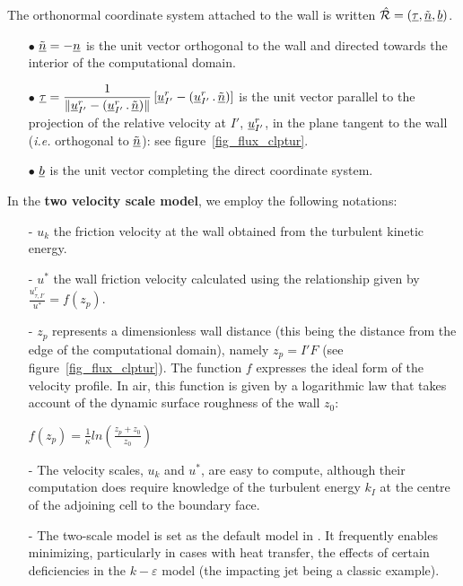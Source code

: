 The orthonormal coordinate system attached to the wall is written
$\hat {\mathcal R}=(\underline{\tau},\underline{\tilde{n}},\underline{b})$.
\begin{itemize}
\item [$\bullet$] $\underline{\tilde{n}}=-\underline{n}$ is the unit vector orthogonal to the wall
and directed towards the interior of the computational domain.
\item [$\bullet$] $\underline{\tau} = \displaystyle\frac{1}{\|\underline{u}^r_{I'}-(\underline{u}^r_{I'}\,.\,\underline{\tilde{n}})\|}\left[\underline{u}^r_{I'}-(\underline{u}^r_{I'}\,.\,\underline{\tilde{n}})\right]$ is the unit vector parallel to the projection of the relative velocity at $I'$, $\underline{u}^r_{I'}$,
in the plane tangent to the wall ({\it i.e.} orthogonal to $\underline{\tilde{n}}$): see
figure~\ref{fig_flux_clptur}.
\item [$\bullet$] $\underline{b}$ is the unit vector completing the direct coordinate system.
\end{itemize}

\vspace{0.5cm}

In the {\bf two velocity scale model}, we employ the following notations:
\begin{itemize}
\item [-] $u_k$ the friction velocity at the wall obtained from the turbulent kinetic energy.

\item [-] $u^*$ the wall friction velocity calculated using the relationship given by $ \displaystyle\frac{u^r_{\tau,I'}}{u^*} = f(z_p)$.

\item [-] $z_p$  represents a dimensionless wall distance
      (this being the distance from the edge of the computational domain), namely
$z_p= I'F$ (see figure~\ref{fig_flux_clptur}). The function $f$ expresses the ideal form of
the velocity profile. In air, this function is given by a logarithmic law that takes account of
the dynamic surface roughness of the wall $z_0$:

$f(z_p)= \displaystyle\frac{1}{\kappa} ln \left ( \displaystyle \frac
      {z_p+z_0}{z_0} \right ) $

\item [-] The velocity scales, $u_k$ and $u^*$, are easy to compute, although their
computation does require knowledge of the turbulent energy $k_I$ at the centre of the
adjoining cell to the boundary face.

\item [-] The two-scale model is set as the default model in \CS. It
frequently enables minimizing, particularly in cases with heat transfer, the effects
of certain deficiencies in the $k-\varepsilon$ model (the impacting jet being
a classic example).
\end{itemize}

